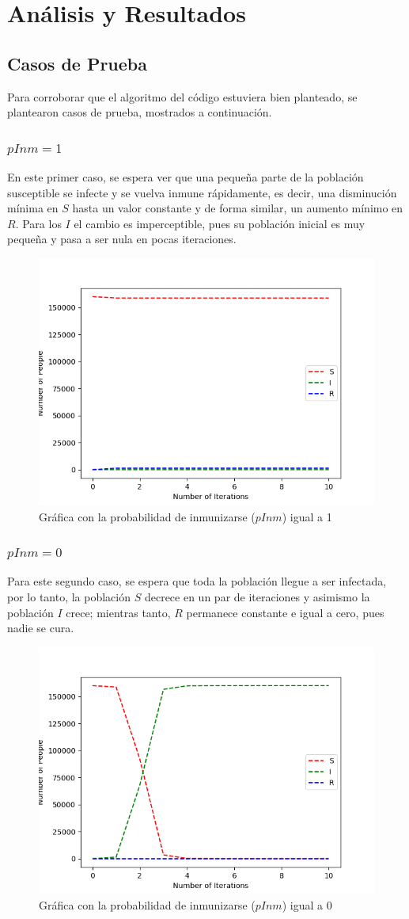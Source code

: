\documentclass[twoside,twocolumn]{article}
\begin{document}
\section{Análisis y Resultados}
\subsection{Casos de Prueba}
Para corroborar que el algoritmo del código estuviera bien planteado, se plantearon casos de prueba, mostrados a continuación.
\subsubsection{$pInm=1$}
En este primer caso, se espera ver que una pequeña parte de la población susceptible se infecte y se vuelva inmune rápidamente, es decir, una disminución mínima en $S$ hasta un valor constante y de forma similar, un aumento mínimo en $R$. Para los $I$ el cambio es imperceptible, pues su población inicial es muy pequeña y pasa a ser nula en pocas iteraciones.
\begin{figure}[H]
\begin{center}
\includegraphics[width=.5\textwidth]{Pinm1}
\caption{Gráfica con la probabilidad de inmunizarse ($pInm$) igual a 1}
\end{center}
\end{figure}
\subsubsection{$pInm=0$}
Para este segundo caso, se espera que toda la población llegue a ser infectada, por lo tanto, la población $S$ decrece en un par de iteraciones y asimismo la población $I$ crece; mientras tanto, $R$ permanece constante e igual a cero, pues nadie se cura. 
\begin{figure}[H]
\begin{center}
\includegraphics[width=.5\textwidth]{0Pinm}
\caption{Gráfica con la probabilidad de inmunizarse ($pInm$) igual a 0}
\end{center}
\end{figure}
\end{document}
